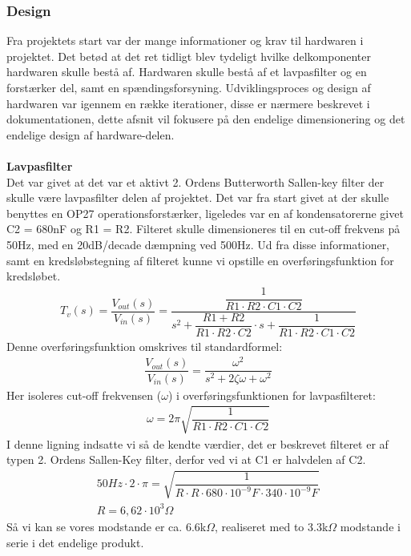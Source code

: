 \subsubsection{Design}
Fra projektets start var der mange informationer og krav til hardwaren i projektet. Det betød at det ret tidligt blev tydeligt hvilke delkomponenter hardwaren skulle bestå af. Hardwaren skulle bestå af et lavpasfilter og en forstærker del, samt en spændingsforsyning. Udviklingsproces og design af hardwaren var igennem en række iterationer, disse er nærmere beskrevet i dokumentationen, dette afsnit vil fokusere på den endelige dimensionering og det endelige design af hardware-delen.\\\\
\textbf{Lavpasfilter}\\
Det var givet at det var et aktivt 2. Ordens Butterworth Sallen-key filter der skulle være lavpasfilter delen af projektet. Det var fra start givet at der skulle benyttes en OP27 operationsforstærker, ligeledes var en af kondensatorerne givet C2 = 680nF og R1 = R2. Filteret skulle dimensioneres til en cut-off frekvens på 50Hz, med en 20dB/decade dæmpning ved 500Hz. Ud fra disse informationer, samt en kredsløbstegning af filteret kunne vi opstille en overføringsfunktion for kredsløbet.
\begin{align}
T_{v}(s)=\dfrac{V_{out}(s)}{V_{in}(s)}=\dfrac{\dfrac{1}{R1\cdot R2\cdot C1\cdot C2}}{s^2+\dfrac{R1 + R2}{R1\cdot R2\cdot C2}\cdot s+\dfrac{1}{R1\cdot R2\cdot C1\cdot C2}}
\end{align}
Denne overføringsfunktion omskrives til standardformel:
\begin{align}
\dfrac{V_{out}(s)}{V_{in}(s)}=\dfrac{\omega^2}{s^2+2\zeta\omega+\omega^2}
\end{align}
Her isoleres cut-off frekvensen ($\omega$) i overføringsfunktionen for lavpasfilteret:
\begin{align}
\omega = 2\pi\sqrt{\dfrac{1}{R1\cdot R2\cdot C1\cdot C2}}
\end{align}
I denne ligning indsatte vi så de kendte værdier, det er beskrevet filteret er af typen 2. Ordens Sallen-Key filter, derfor ved vi at C1 er halvdelen af C2.\cite{wikifilter}
\begin{align}
50Hz\cdot 2\cdot \pi = \sqrt{\dfrac{1}{R\cdot R\cdot 680\cdot 10^{-9}F\cdot 340\cdot 10^{-9}F}}\\
R=6,62\cdot 10^3 \Omega
\end{align}
Så vi kan se vores modstande er ca. 6.6k$\Omega$, realiseret med to 3.3k$\Omega$ modstande i serie i det endelige produkt.\\\\
